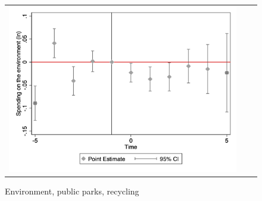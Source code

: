 \begin{figure}[ht]
\begin{tabular}{@{}ccc@{}}
\begin{minipage}[t]{0.32\textwidth}
            \centering
            \caption{Environment, public parks, recycling}
            \includegraphics[width=\linewidth]{images/total population/caseventdd_ln_q4_09_step1.jpg}
            \label{fig:casenvironment}
        \end{minipage}
    \end{tabular}
\end{figure}
